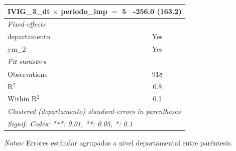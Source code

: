 \documentclass[12pt]{article}
\begin{document}
\begin{table}[htbp]
\begin{threeparttable}
\begin{tabular}{lc}
      IVIG\_3\_dt $\times$ periodo\_imp $=$ 5       & -256.0 (163.2)\\   
      \midrule
      \emph{Fixed-effects}\\
      departamento                                  & Yes\\  
      ym\_2                                         & Yes\\  
      \midrule
      \emph{Fit statistics}\\
      Observations                                  & 918\\  
      R$^2$                                         & 0.8\\  
      Within R$^2$                                  & 0.1\\  
      \midrule \midrule
      \multicolumn{2}{l}{\emph{Clustered (departamento) standard-errors in parentheses}}\\
      \multicolumn{2}{l}{\emph{Signif. Codes: ***: 0.01, **: 0.05, *: 0.1}}\\
   \end{tabular}


\begin{tablenotes}
\footnotesize
\item \textit{Notas:} Errores estándar agrupados a nivel departamental entre paréntesis.
\end{tablenotes}
\end{threeparttable}
\end{table}
\end{document}
